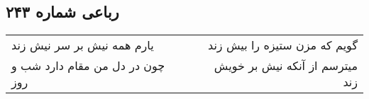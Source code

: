\begin{center}
\section*{رباعی شماره ۲۴۳}
\label{sec:sh243}
\begin{longtable}{l p{0.5cm} r}
یارم همه نیش بر سر نیش زند
&&
گویم که مزن ستیزه را بیش زند
\\
چون در دل من مقام دارد شب و روز
&&
میترسم از آنکه نیش بر خویش زند
\\
\end{longtable}
\end{center}
